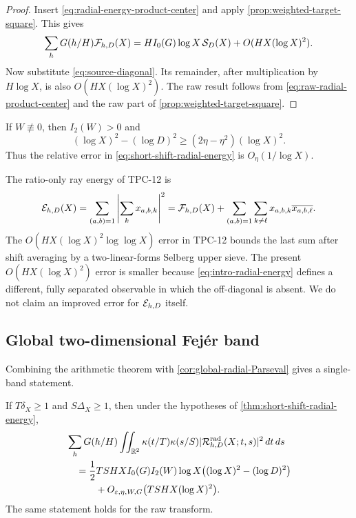 \begin{proof}
Insert \eqref{eq:radial-energy-product-center} and apply
\cref{prop:weighted-target-square}.  This gives
\[
 \sum_hG(h/H)\mathcal F_{h,D}(X)
 =HI_0(G)\log X\,\mathcal S_D(X)
 +O(HX(\log X)^2).
\]
Now substitute \eqref{eq:source-diagonal}.  Its remainder, after
multiplication by $H\log X$, is also $O(HX(\log X)^2)$.  The raw result
follows from \eqref{eq:raw-radial-product-center} and the raw part of
\cref{prop:weighted-target-square}.
\end{proof}

If $W\not\equiv0$, then $I_2(W)>0$ and
\[
 (\log X)^2-(\log D)^2
 \geq(2\eta-\eta^2)(\log X)^2.
\]
Thus the relative error in \eqref{eq:short-shift-radial-energy} is
$O_{\eta}(1/\log X)$.

\begin{remark}
The ratio-only ray energy of TPC-12 is
\begin{equation}
 \mathcal E_{h,D}(X)
 =\sum_{(a,b)=1}\left|\sum_kx_{a,b,k}\right|^2
 =\mathcal F_{h,D}(X)
 +\sum_{(a,b)=1}\sum_{k\ne\ell}
 x_{a,b,k}\overline{x_{a,b,\ell}}.
 \label{eq:old-versus-new-energy}
\end{equation}
The $O(HX(\log X)^2\log\log X)$ error in TPC-12 bounds the last sum
after shift averaging by a two-linear-forms Selberg upper sieve.  The
present $O(HX(\log X)^2)$ error is smaller because
\eqref{eq:intro-radial-energy} defines a different, fully separated
observable in which the off-diagonal is absent.  We do not claim an
improved error for $\mathcal E_{h,D}$ itself.
\end{remark}

\subsection{Global two-dimensional Fej\'er band}

Combining the arithmetic theorem with
\cref{cor:global-radial-Parseval} gives a single-band statement.

\begin{corollary}
\label{cor:short-shift-global-band}
If $T\delta_X\geq1$ and $S\Delta_X\geq1$, then under the hypotheses of
\cref{thm:short-shift-radial-energy},
\begin{equation}
 \begin{aligned}
 &\sum_hG(h/H)\iint_{\mathbb R^2}
 \kappa(t/T)\kappa(s/S)
 |\mathcal R^{\mathrm{rad}}_{h,D}(X;t,s)|^2\,dt\,ds\\
 &\quad={}
 \frac12TSHX I_0(G)I_2(W)\log X
 \bigl((\log X)^2-(\log D)^2\bigr)\\
 &\qquad\quad+O_{\varepsilon,\eta,W,G}
 \bigl(TSHX(\log X)^2\bigr).
 \end{aligned}
 \label{eq:short-shift-global-band}
\end{equation}
The same statement holds for the raw transform.
\end{corollary}

